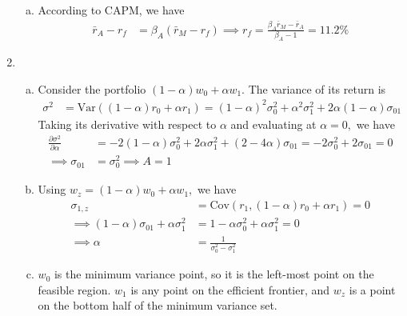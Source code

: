 \documentclass{article}
\newcommand{\var}{\mathrm{Var}}
\newcommand{\cov}{\mathrm{Cov}}
\begin{document}
\begin{enumerate}
\begin{enumerate}[(a)]
			\item 
				\begin{soln}
					According to CAPM, we have 
					\begin{align*}
						\bar r_A -r_f &= \beta_A(\bar r_M-r_f) \implies r_f = \frac{\beta_A\bar r_M - \bar r_A}{\beta_A-1} = 11.2\%
					\end{align*}
				\end{soln}
		\end{enumerate}

	\item 
		\begin{enumerate}[(a)]
			\item 
				\begin{soln}
					Consider the portfolio $(1-\alpha)w_0 + \alpha w_1.$ The variance of its return is
					\begin{align*}
						\sigma^2 &= \var( (1-\alpha)r_0 + \alpha r_1) = (1-\alpha)^2 \sigma_0^2 + \alpha^2 \sigma_1^2 + 2\alpha(1-\alpha)\sigma_{01}
					\end{align*}
					Taking its derivative with respect to $\alpha$ and evaluating at $\alpha=0,$ we have
					\begin{align*}
						\frac{\partial \sigma^2}{\partial \alpha} &= -2(1-\alpha)\sigma_0^2 + 2\alpha\sigma_1^2 + (2-4\alpha)\sigma_{01} = -2\sigma_0^2 + 2\sigma_{01} = 0 \\
						\implies \sigma_{01} &= \sigma_0^2 \implies A = 1
					\end{align*}
				\end{soln}

			\item 
				\begin{soln}
					Using $w_z=(1-\alpha)w_0+\alpha w_1,$ we have
					\begin{align*}
						\sigma_{1, z} &= \cov\left( r_1, (1-\alpha)r_0 + \alpha r_1 \right) = 0 \\
						\implies (1-\alpha) \sigma_{01} + \alpha\sigma_1^2 &= 1-\alpha\sigma_0^2 + \alpha\sigma_1^2 = 0 \\
						\implies \alpha &= \frac{1}{\sigma_0^2-\sigma_1^2}
					\end{align*}
				\end{soln}

			\item 
				\begin{soln}
					$w_0$ is the minimum variance point, so it is the left-most point on the feasible region. $w_1$ is any point on the efficient frontier, and $w_z$ is a point on the bottom half of the minimum variance set.
				\end{soln}


\end{enumerate}
\end{enumerate}
\end{document}
